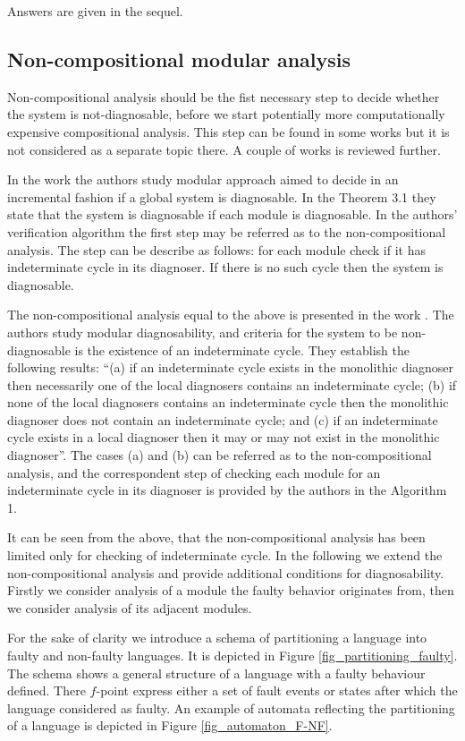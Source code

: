 \documentclass[a4paper,oneside]{article}
\begin{document}
Answers are given in the sequel.

\subsection{Non-compositional modular analysis}
Non-compositional analysis should be the fist necessary step to decide
whether the system is not-diagnosable, before we start potentially more
computationally expensive compositional analysis. This step can be found in
some works but it is not considered as a separate topic there. A couple of works
is reviewed further.

In the work \cite{debouk_modular_2002} the authors study modular approach
aimed to decide in an incremental fashion if a global system is diagnosable. In
the Theorem 3.1 they state that the system is diagnosable if each module is
diagnosable. In the authors' verification algorithm the first step may be
referred as to the non-compositional analysis. The step can be describe as
follows: for each module check if it has indeterminate cycle in its diagnoser.
If there is no such cycle then the system is diagnosable. 

The non-compositional analysis equal to the above is presented in the work
\cite{contant_diagnosability_2006}. The authors study modular diagnosability,
and criteria for the system to be non-diagnosable is the existence of
an indeterminate cycle. They establish the following results: 
``(a) if an indeterminate cycle exists in the monolithic diagnoser then
necessarily one of the local diagnosers contains an indeterminate cycle; 
(b) if none of the local diagnosers contains an indeterminate cycle then the
monolithic diagnoser does not contain an indeterminate cycle; and 
(c) if an indeterminate cycle exists in a local diagnoser then it may or may not
exist in the monolithic diagnoser''.
The cases (a) and (b) can be referred as to the non-compositional analysis, and
the correspondent step of checking each module for an indeterminate
cycle in its diagnoser is provided by the authors in the Algorithm 1.

It can be seen from the above, that the non-compositional analysis has
been limited only for checking of indeterminate cycle. In the following we
extend the non-compositional analysis and provide additional conditions for
diagnosability. Firstly we consider analysis of a module the faulty
behavior originates from, then we consider analysis of its adjacent modules.  

For the sake of clarity we introduce a schema of partitioning a language
into faulty and non-faulty languages. It is depicted in 
Figure \ref{fig_partitioning_faulty}. The schema shows a general structure of
a language with a faulty behaviour defined. There $f$-point express either a set
of fault events or states after which the language considered as faulty.  An
example of automata reflecting the partitioning of a language is depicted in
Figure \ref{fig_automaton_F-NF}.
\end{document}
